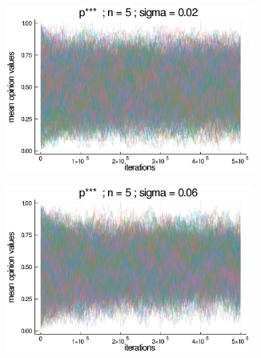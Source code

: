 \documentclass{article}
\begin{document}
    
    \begin{figure}[H]
      \centering
      \begin{subfigure}[b]{0.48\textwidth}
      \includegraphics[width=0.9\textwidth]{img/series/tseries3/Poodlcalculatep***n5-rho01118033988749895-sigma002-00intransrandom.png}
    \end{subfigure}
    \begin{subfigure}[b]{0.48\textwidth}
      \includegraphics[width=0.9\textwidth]{img/series/tseries3/Poodlcalculatep***n5-rho01118033988749895-sigma006-00intransrandom.png}
    \end{subfigure}

\end{figure}
\end{document}
